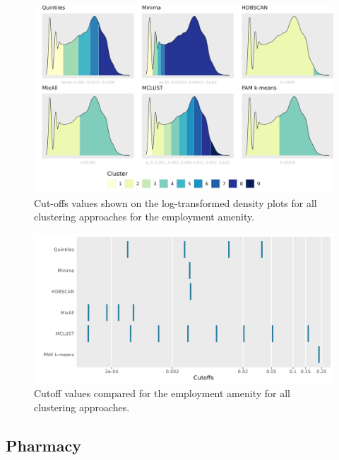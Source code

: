 \documentclass[11pt, a4paper]{article}
\begin{document}
\begin{figure}[H]
\centering
\includegraphics[width=\textwidth]{./cutoffs/by_amenity/Employment_cutoffs.png}
\caption[Employment cutoffs]{Cut-offs values shown on the log-transformed density plots for all clustering approaches for the employment amenity.}\label{employmentcutoffs}
\end{figure}



\begin{figure}[H]
\centering
\includegraphics[width=\textwidth]{./cutoff_ticks/Employment_ticks.png}
\caption[Employment cutoff comparison]{Cutoff values compared for the employment amenity for all clustering approaches.}\label{employmentticks}
\end{figure}









\pagebreak
\justifying
\subsection{Pharmacy}
\end{document}
